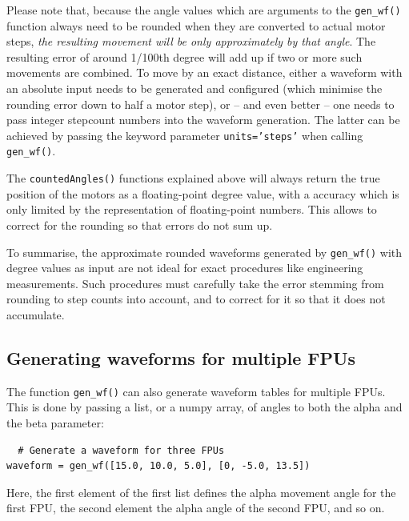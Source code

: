 \documentclass[fontsize=12,a4paper]{scrreprt}
\begin{document}
%
Please note that, because the angle values which are arguments to the
\texttt{gen\_wf()} function always need to be rounded when they are
converted to actual motor steps, \emph{the resulting movement will be
  only approximately by that angle}. The resulting error of around
1/100th degree will add up if two or more such movements are
combined. To move by an exact distance, either a waveform with an
absolute input needs to be generated and configured (which minimise
the rounding error down to half a motor step), or -- and even better
-- one needs to pass integer stepcount numbers into the waveform
generation. The latter can be achieved by passing the keyword
parameter \texttt{units='steps'} when calling \texttt{gen\_wf()}.

The \texttt{countedAngles()} functions explained above will always
return the true position of the motors as a floating-point degree
value, with a accuracy which is only limited by the representation of
floating-point numbers. This allows to correct for the rounding so
that errors do not sum up.

To summarise, the approximate rounded waveforms generated by
\texttt{gen\_wf()} with degree values as input are not ideal for exact
procedures like engineering measurements. Such procedures must
carefully take the error stemming from rounding to step counts into
account, and to correct for it so that it does not accumulate.

\subsection{Generating waveforms for multiple FPUs}
The function \texttt{gen\_wf()} can also generate waveform tables for
multiple FPUs. This is done by passing a list, or a numpy array,
of angles to both the alpha and the beta parameter:

\begin{verbatim}
  # Generate a waveform for three FPUs
waveform = gen_wf([15.0, 10.0, 5.0], [0, -5.0, 13.5])
\end{verbatim}

Here, the first element of the first list
defines the alpha movement angle for the
first FPU, the second element the alpha
angle of the second FPU, and so on.
\end{document}
